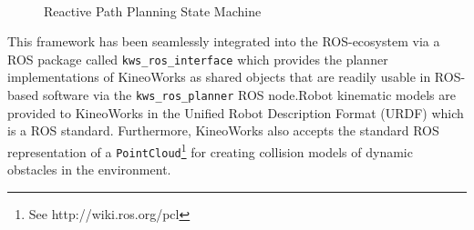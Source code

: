 \begin{figure}[h]
\centering
{}\\[-10pt]
\caption[]{Reactive Path Planning State Machine}
\label{fig:KineoStates}
\end{figure}

This framework has been seamlessly integrated into the ROS-ecosystem via a ROS package called \texttt{kws\_ros\_interface} which provides the planner implementations of KineoWorks as shared objects that are readily usable in ROS-based software via the \texttt{kws\_ros\_planner} ROS node.Robot kinematic models are provided to KineoWorks in the Unified Robot Description Format (URDF) which is a ROS standard. Furthermore, KineoWorks also accepts the standard ROS representation of a \texttt{PointCloud}\footnote{See http://wiki.ros.org/pcl} for creating collision models of dynamic obstacles in the environment. 

